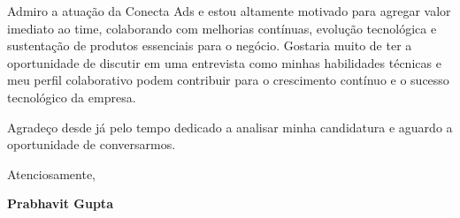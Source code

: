 \documentclass[11pt,a4paper]{article}
\begin{document}
\vspace{3mm}
\noindent Admiro a atuação da Conecta Ads e estou altamente motivado para agregar valor imediato ao time, colaborando com melhorias contínuas, evolução tecnológica e sustentação de produtos essenciais para o negócio. Gostaria muito de ter a oportunidade de discutir em uma entrevista como minhas habilidades técnicas e meu perfil colaborativo podem contribuir para o crescimento contínuo e o sucesso tecnológico da empresa.

\vspace{3mm}
\noindent Agradeço desde já pelo tempo dedicado a analisar minha candidatura e aguardo a oportunidade de conversarmos.

\vspace{5mm}
\noindent Atenciosamente,

\vspace{5mm}
\noindent \textbf{Prabhavit Gupta}
\end{document}

